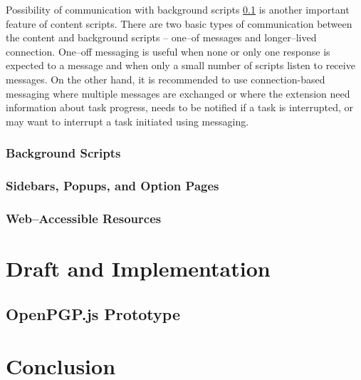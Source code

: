 Possibility of communication with background scripts \ref{text:backgroundScripts} is another important feature of content scripts. There are two basic types of communication between the content and background scripts -- one--of messages and longer--lived connection. One--off messaging is useful when none or only one response is expected to a message and when only a small number of scripts listen to receive messages. On the other hand, it is recommended to use connection-based messaging where multiple messages are exchanged or where the extension need information about task progress, needs to be notified if a task is interrupted, or may want to interrupt a task initiated using messaging.

\subsection{Background Scripts}
\label{text:backgroundScripts}
\subsection{Sidebars, Popups, and Option Pages}
\subsection{Web--Accessible Resources}

\chapter{Draft and Implementation}

\section{OpenPGP.js Prototype}
\label{prototype:OpenPGPjs}


\chapter{Conclusion}
